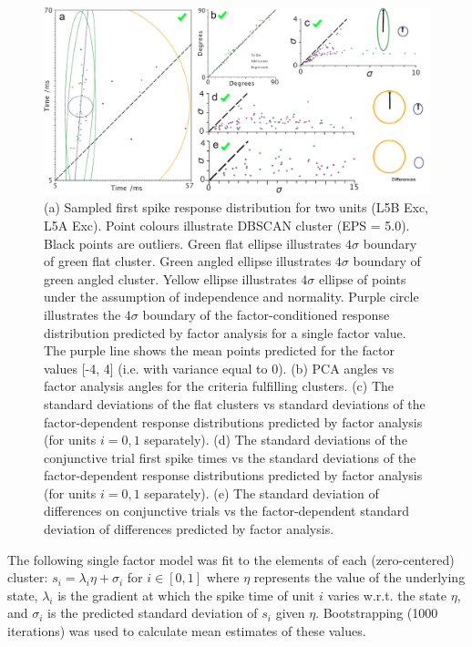 \documentclass{article}
\begin{document}
\begin{figure}[t!]
\centering
\includegraphics[width=\textwidth]{Figure5.pdf}
\caption{(a) Sampled first spike response distribution for two units (L5B Exc, L5A Exc). Point colours illustrate DBSCAN cluster (EPS = 5.0). Black points are outliers. Green flat ellipse illustrates $4\sigma$ boundary of green flat cluster. Green angled ellipse illustrates $4\sigma$ boundary of green angled cluster. Yellow ellipse illustrates $4\sigma$ ellipse of points under the assumption of independence and normality. Purple circle illustrates the $4\sigma$ boundary of the factor-conditioned response distribution predicted by factor analysis for a single factor value. The purple line shows the mean points predicted for the factor values [-4, 4] (i.e. with variance equal to 0). (b) PCA angles vs factor analysis angles for the criteria fulfilling clusters. (c) The standard deviations of the flat clusters vs standard deviations of the factor-dependent response distributions predicted by factor analysis (for units $i = 0,1$ separately). (d) The standard deviations of the conjunctive trial first spike times vs the standard deviations of the factor-dependent response distributions predicted by factor analysis (for units $i = 0,1$ separately). (e) The standard deviation of differences on conjunctive trials vs the factor-dependent standard deviation of differences predicted by factor analysis.}
\label{fig:universe}
\end{figure}



The following single factor model was fit to the elements of each (zero-centered) cluster: $s_i = \lambda_i \eta + \sigma_i$ for $i \in [0, 1]$ 
where $\eta$ represents the value of the underlying state, 
$\lambda_i$ is the gradient at which the spike time of unit $i$ varies w.r.t. the state $\eta$, 
and $\sigma_i$ is the predicted standard deviation of $s_i$ given $\eta$. Bootstrapping (1000 iterations) was used to calculate mean estimates of these values.
\end{document}

